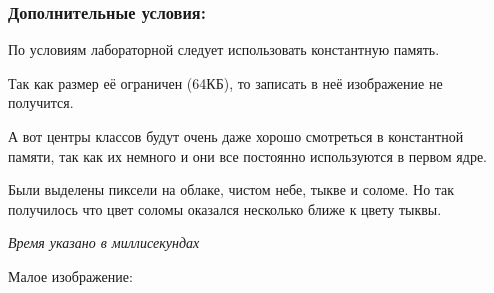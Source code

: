 \documentclass[12pt]{article}
\begin{document}
\subsubsection*{Дополнительные условия:}

По условиям лабораторной следует использовать константную память.

Так как размер её ограничен (64КБ), то записать в неё изображение не получится.

А вот центры классов будут очень даже хорошо смотреться в константной памяти,
так как их немного и они все постоянно используются в первом ядре.

{
}





Были выделены пиксели на облаке, чистом небе, тыкве и соломе.
Но так получилось что цвет соломы оказался несколько ближе к цвету тыквы.

\textit{Время указано в миллисекундах}

Малое изображение:
\end{document}
